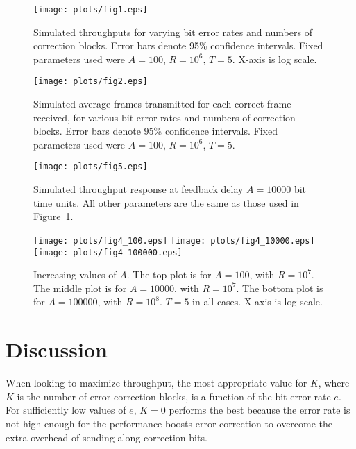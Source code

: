 \documentclass[twocolumn]{article}
\begin{document}
\begin{figure}
    \centering
    \texttt{[image: plots/fig1.eps]}
    \caption{ Simulated throughputs for varying bit error rates and numbers of correction
    blocks. Error bars denote 95\% confidence intervals. Fixed parameters used were 
    $A = 100$, $R = 10^6$, $T=5$. X-axis is log scale. }
    \label{fig:kthroughput}
\end{figure}

\begin{figure}
    \centering
    \texttt{[image: plots/fig2.eps]}
    \caption{ Simulated average frames transmitted for each correct frame received, for
    various bit error rates and numbers of correction blocks. Error bars denote 
    95\% confidence intervals. Fixed parameters used were 
    $A = 100$, $R = 10^6$, $T=5$. }
    \label{fig:kframes}
\end{figure}

\begin{figure}
    \centering
    \texttt{[image: plots/fig5.eps]}
    \caption{ Simulated throughput response at feedback delay $A=10000$ bit time units. 
        All other parameters are the same as those used in Figure~\ref{fig:kthroughput}.
    }
    \label{fig:a10000}
\end{figure}

\begin{figure}
    \centering
    \texttt{[image: plots/fig4\_100.eps]}
    \texttt{[image: plots/fig4\_10000.eps]}
    \texttt{[image: plots/fig4\_100000.eps]}
    \caption{ Increasing values of $A$. The top plot is for $A=100$, with $R=10^7$. The middle
    plot is for $A=10000$, with $R=10^7$. The bottom plot is for $A=100000$, with $R=10^8$.
    $T=5$ in all cases. X-axis is log scale. } 
    \label{fig:a}
\end{figure}


\section*{Discussion}

    When looking to maximize throughput, the most appropriate value for $K$, where $K$ 
    is the number of error correction blocks,
    is a function of the bit error rate $e$. For sufficiently low values of $e$, $K=0$ 
    performs the best because the error rate is not high enough for the 
    performance boosts error correction to overcome the extra overhead of sending along 
    correction bits.
\end{document}
